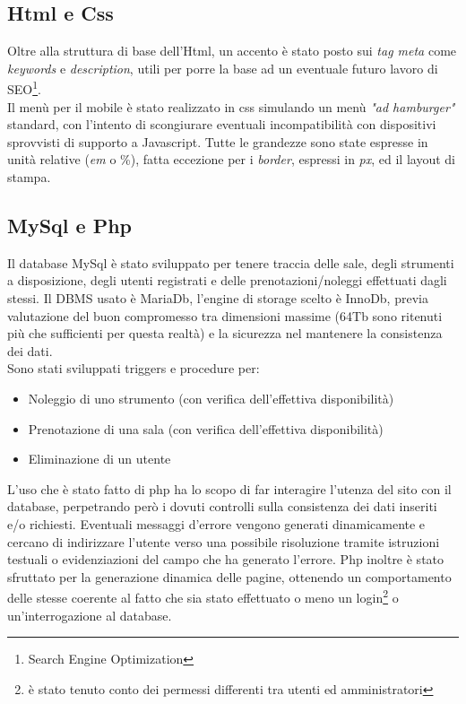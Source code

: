 \pagebreak

\subsection{Html e Css}
Oltre alla struttura di base dell'Html, un accento è stato posto sui \emph{tag meta} come \emph{keywords} e \emph{description}, utili per porre la base ad un eventuale futuro lavoro di SEO\footnote{Search Engine Optimization}. \\
Il menù per il mobile è stato realizzato in css simulando un menù \emph{"ad hamburger"} standard, con l'intento di scongiurare eventuali incompatibilità con dispositivi sprovvisti di supporto a Javascript. Tutte le grandezze sono state espresse in unità relative (\emph{em} o \%), fatta eccezione per i \emph{border}, espressi in \emph{px}, ed il layout di stampa.


\subsection{MySql e Php}
Il database MySql è stato sviluppato per tenere traccia delle sale, degli strumenti a disposizione, degli utenti registrati e delle prenotazioni/noleggi effettuati dagli stessi. Il DBMS usato è MariaDb, l'engine di storage scelto è InnoDb, previa valutazione del buon compromesso tra dimensioni massime (64Tb sono ritenuti più che sufficienti per questa realtà) e la sicurezza nel mantenere la consistenza dei dati.\\
Sono stati sviluppati triggers e procedure per:
\begin{itemize}
\item Noleggio di uno strumento (con verifica dell'effettiva disponibilità)
\item Prenotazione di una sala (con verifica dell'effettiva disponibilità)
\item Eliminazione di un utente
\end{itemize}
L'uso che è stato fatto di php ha lo scopo di far interagire l'utenza del sito con il database, perpetrando però i dovuti controlli sulla consistenza dei dati inseriti e/o richiesti. Eventuali messaggi d'errore vengono generati dinamicamente e cercano di indirizzare l'utente verso una possibile risoluzione tramite istruzioni testuali o evidenziazioni del campo che ha generato l'errore. Php inoltre è stato sfruttato per la generazione dinamica delle pagine, ottenendo un comportamento delle stesse coerente al fatto che sia stato effettuato o meno un login\footnote{è stato tenuto conto dei permessi differenti tra utenti ed amministratori} o un'interrogazione al database.


